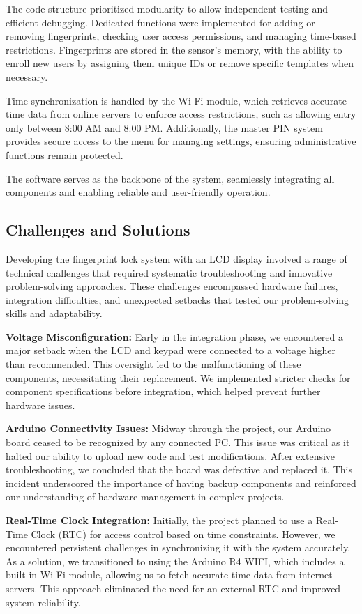\documentclass{article}
\begin{document}
The code structure prioritized modularity to allow independent testing and efficient debugging. Dedicated functions were implemented for adding or removing fingerprints, checking user access permissions, and managing time-based restrictions. Fingerprints are stored in the sensor's memory, with the ability to enroll new users by assigning them unique IDs or remove specific templates when necessary.

Time synchronization is handled by the Wi-Fi module, which retrieves accurate time data from online servers to enforce access restrictions, such as allowing entry only between 8:00 AM and 8:00 PM. Additionally, the master PIN system provides secure access to the menu for managing settings, ensuring administrative functions remain protected.

The software serves as the backbone of the system, seamlessly integrating all components and enabling reliable and user-friendly operation.

\newpage
\subsection{Challenges and Solutions}

Developing the fingerprint lock system with an LCD display involved a range of technical challenges that required systematic troubleshooting and innovative problem-solving approaches. These challenges encompassed hardware failures, integration difficulties, and unexpected setbacks that tested our problem-solving skills and adaptability.

\textbf{Voltage Misconfiguration:} Early in the integration phase, we encountered a major setback when the LCD and keypad were connected to a voltage higher than recommended. This oversight led to the malfunctioning of these components, necessitating their replacement. We implemented stricter checks for component specifications before integration, which helped prevent further hardware issues.

\textbf{Arduino Connectivity Issues:} Midway through the project, our Arduino board ceased to be recognized by any connected PC. This issue was critical as it halted our ability to upload new code and test modifications. After extensive troubleshooting, we concluded that the board was defective and replaced it. This incident underscored the importance of having backup components and reinforced our understanding of hardware management in complex projects.

\textbf{Real-Time Clock Integration:} Initially, the project planned to use a Real-Time Clock (RTC) for access control based on time constraints. However, we encountered persistent challenges in synchronizing it with the system accurately. As a solution, we transitioned to using the Arduino R4 WIFI, which includes a built-in Wi-Fi module, allowing us to fetch accurate time data from internet servers. This approach eliminated the need for an external RTC and improved system reliability.
\end{document}
